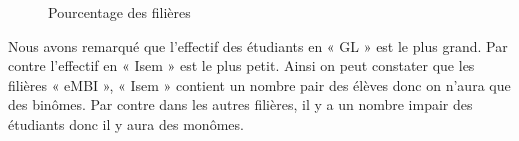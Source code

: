 \documentclass{article}
\begin{document}
            \begin{figure}[h!]
                \centering
                \caption{Pourcentage des filières}
                \label{fig:10}
            \end{figure}
            \newpage Nous avons remarqué que l’effectif des étudiants en « GL » est le plus grand. Par contre l’effectif en « Isem » est le plus petit. Ainsi on peut constater que les filières « eMBI », « Isem » contient un nombre pair des élèves donc on n’aura que des binômes. Par contre dans les autres filières, il y a un nombre impair des étudiants donc il y aura des monômes.
\end{document}
